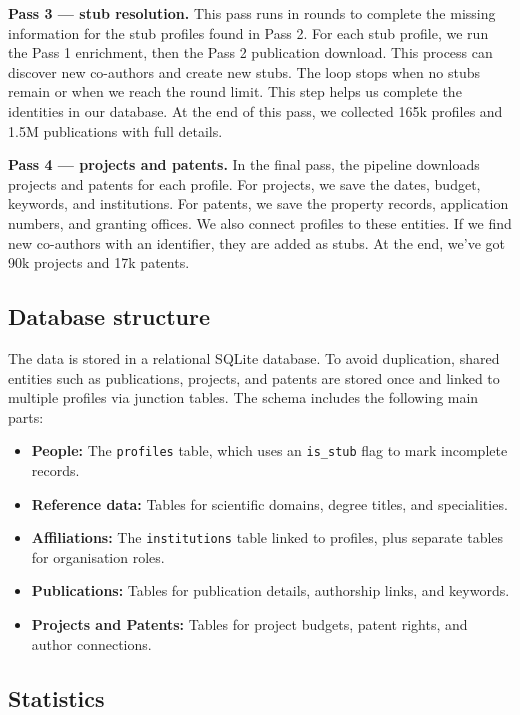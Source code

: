 \documentclass{article}
\begin{document}
\textbf{Pass 3 --- stub resolution.}
This pass runs in rounds to complete the missing information for the stub profiles found in Pass 2. For each stub profile, we run the Pass 1 enrichment, then the Pass 2 publication download. This process can discover new co-authors and create new stubs. The loop stops when no stubs remain or when we reach the round limit. This step helps us complete the identities in our database. At the end of this pass, we collected 165k profiles and 1.5M publications with full details.

\textbf{Pass 4 --- projects and patents.}
In the final pass, the pipeline downloads projects and patents for each profile. For projects, we save the dates, budget, keywords, and institutions. For patents, we save the property records, application numbers, and granting offices. We also connect profiles to these entities. If we find new co-authors with an identifier, they are added as stubs. At the end, we've got 90k projects and 17k patents.

\subsection{Database structure}
The data is stored in a relational SQLite database. To avoid duplication, shared entities such as publications, projects, and patents are stored once and linked to multiple profiles via junction tables. The schema includes the following main parts:

\begin{itemize}
  \item \textbf{People:} The \texttt{profiles} table, which uses an \texttt{is\_stub} flag to mark incomplete records.
  \item \textbf{Reference data:} Tables for scientific domains, degree titles, and specialities.
  \item \textbf{Affiliations:} The \texttt{institutions} table linked to profiles, plus separate tables for organisation roles.
  \item \textbf{Publications:} Tables for publication details, authorship links, and keywords.
  \item \textbf{Projects and Patents:} Tables for project budgets, patent rights, and author connections.
\end{itemize}

\subsection{Statistics}
\end{document}
